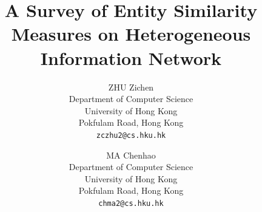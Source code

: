 \documentclass{acm_proc_article-csis8101}
\begin{document}
%

\title{A Survey of Entity Similarity Measures on Heterogeneous Information Network}
%

\author{
ZHU Zichen\\
Department of Computer Science\\
University of Hong Kong\\
Pokfulam Road, Hong Kong\\
\texttt{zczhu2@cs.hku.hk}
\and MA Chenhao\\
Department of Computer Science\\
University of Hong Kong \\
Pokfulam Road, Hong Kong \\
\texttt{chma2@cs.hku.hk}
}
\end{document}
